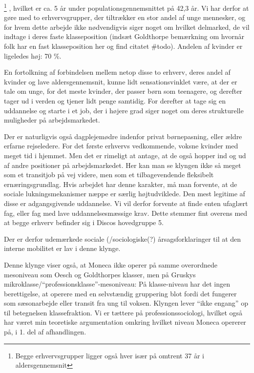 %
\footnote{ Begge erhvervsgrupper ligger også hver især på omtrent 37 år i aldersgennemsnit}%
%
, hvilket er ca. 5 år under populationsgennemsnittet på 42,3 år. Vi har derfor at gøre med to erhvervsgrupper, der tiltrækker en stor andel af unge mennesker, og for hvem dette arbejde ikke nødvendigvis siger noget om hvilket delmarked, de vil indtage i deres faste klasseposition (indsæt Goldthorpe bemærkning om hvornår folk har en fast klasseposition her og find citatet \#todo). Andelen af kvinder er ligeledes høj: 70 \%. 

En fortolkning af forbindelsen mellem netop disse to erhverv, deres andel af kvinder og lave aldersgennemsnit, kunne  lidt sensationsvinklet være, at der er tale om unge, for det meste kvinder, der passer børn som teenagere, og derefter tager ud i verden og tjener lidt penge samtidig. For derefter at tage sig en uddannelse og starte i et job, der i højere grad siger noget om deres strukturelle muligheder på arbejdsmarkedet. 


Der er naturligvis også dagplejemødre indenfor privat børnepasning, eller ældre erfarne rejseledere. For det første erhvervs vedkommende, voksne kvinder med meget tid i hjemmet. Men det er rimeligt at antage, at de også hopper ind og ud af andre positioner på arbejdsmarkedet. Her kan man se klyngen ikke så meget som et transitjob på vej videre, men som et tilbagevendende fleksibelt ernæringsgrundlag. Hvis arbejdet har denne karakter, må man forvente, at de sociale lukningsmekanismer næppe er særlig højtudviklede. Den mest legitime af disse er adgangsgivende uddannelse. Vi vil derfor forvente at finde enten ufaglært fag, eller fag med lave uddannelsesmæssige krav. Dette stemmer fint overens med at begge erhverv befinder sig i Discos hovedgruppe 5. 

Der er derfor udemærkede sociale (/sociologiske(?) årsagsforklaringer til at den interne mobilitet er lav i denne klynge. 

Denne klynge viser også, at Moneca ikke operer på samme overordnede mesoniveau som Oesch og Goldthorpes klasser, men på Gruskys mikroklasse/“professionsklasse”-mesoniveau: %
På klasse-niveau har det ingen berettigelse, at operere med en selvstændig gruppering blot fordi det fungerer som sæsonarbejde eller transit fra ung til voksen. Klyngen lever “ikke engang” op til betegnelsen klassefraktion. Vi er  tættere på professionssociologi, hvilket også har været min teoretiske argumentation omkring hvilket niveau Moneca opererer på, i 1. del af afhandlingen. 

